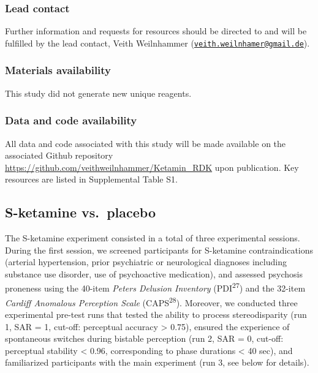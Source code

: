 \documentclass[
]{article}
\begin{document}
\hypertarget{lead-contact}{%
\subsubsection{Lead contact}\label{lead-contact}}

Further information and requests for resources should be directed to and
will be fulfilled by the lead contact, Veith Weilnhammer
(\href{mailto:veith.weilnhamer@gmail.de}{\nolinkurl{veith.weilnhamer@gmail.de}}).

\hypertarget{materials-availability}{%
\subsubsection{Materials availability}\label{materials-availability}}

This study did not generate new unique reagents.

\hypertarget{data-and-code-availability}{%
\subsubsection{Data and code
availability}\label{data-and-code-availability}}

All data and code associated with this study will be made available on
the associated Github repository
\url{https://github.com/veithweilnhammer/Ketamin_RDK} upon publication.
Key resources are listed in Supplemental Table S1.

\hypertarget{s-ketamine-vs.-placebo}{%
\subsection{S-ketamine vs.~placebo}\label{s-ketamine-vs.-placebo}}

The S-ketamine experiment consisted in a total of three experimental
sessions. During the first session, we screened participants for
S-ketamine contraindications (arterial hypertension, prior psychiatric
or neurological diagnoses including substance use disorder, use of
psychoactive medication), and assessed psychosis proneness using the
40-item \emph{Peters Delusion Inventory} (PDI\textsuperscript{27}) and
the 32-item \emph{Cardiff Anomalous Perception Scale}
(CAPS\textsuperscript{28}). Moreover, we conducted three experimental
pre-test runs that tested the ability to process stereodisparity (run 1,
SAR = 1, cut-off: perceptual accuracy \textgreater{} 0.75), ensured the
experience of spontaneous switches during bistable perception (run 2,
SAR = 0, cut-off: perceptual stability \textless{} 0.96, corresponding
to phase durations \textless{} 40 sec), and familiarized participants
with the main experiment (run 3, see below for details).
\end{document}
